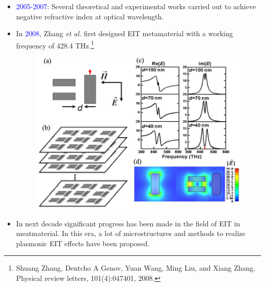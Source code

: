 \documentclass[9pt,aspectratio94]{beamer}
\begin{document}
       \begin{frame}
       \begin{itemize}
           \item \textcolor{blue}{2005-2007}: Several theoretical and experimental works carried out to achieve negative refractive index at optical wavelength.
           \item In \textcolor{blue}{2008}, Zhang \textit{et al.} first designed EIT metamaterial with a working frequency of 428.4 THz.\footnote{ Shuang Zhang, Dentcho A Genov, Yuan Wang, Ming Liu, and Xiang Zhang. Physical review letters, 101(4):047401, 2008.}
           \begin{figure}
           \includegraphics[scale=0.6]{EIT MM (Zhang et al).png}
           \end{figure}
           \item In next decade significant progress has been made in the field of EIT in meatmaterial. In this era, a lot of microstructures and methods to realize plasmonic EIT effects have been proposed. 

       \end{itemize}
   \end{frame}
\end{document}
